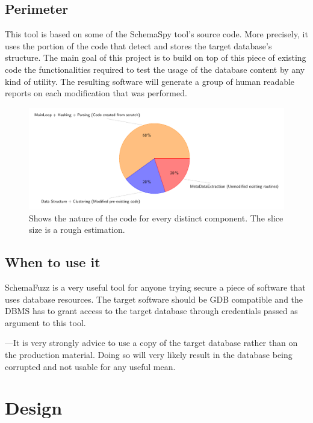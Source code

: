 \documentclass{article}
\begin{document}
\begin{empfile}
		\subsection{Perimeter}
This tool is based on some of the SchemaSpy tool's source code. More precisely, it uses the portion of the code that detect and stores the target database's structure.
The main goal of this project is to build on top of this piece of existing code the functionalities required to test the usage of the database content by any kind of utility.  		
The resulting software will generate a group of human readable reports on each modification that was performed.		
		\begin{figure} [h!]
		\includegraphics[width=\textwidth]{codeOriginDiagram.pdf}
		\caption{Shows the nature of the code for every distinct component. The slice size is a rough estimation.}
		\end{figure}
		\subsection{When to use it}
SchemaFuzz is a very useful tool for anyone trying secure a piece of software that uses database resources. The target software should be GDB compatible and the DBMS has to grant access to the target database through credentials passed as argument to this tool.

---It is very strongly advice to use a copy of the target database rather than on the production material. Doing so will very likely result in the database being corrupted and not usable for any useful mean.

		\clearpage

	\section{Design}

\end{empfile}
\end{document}
